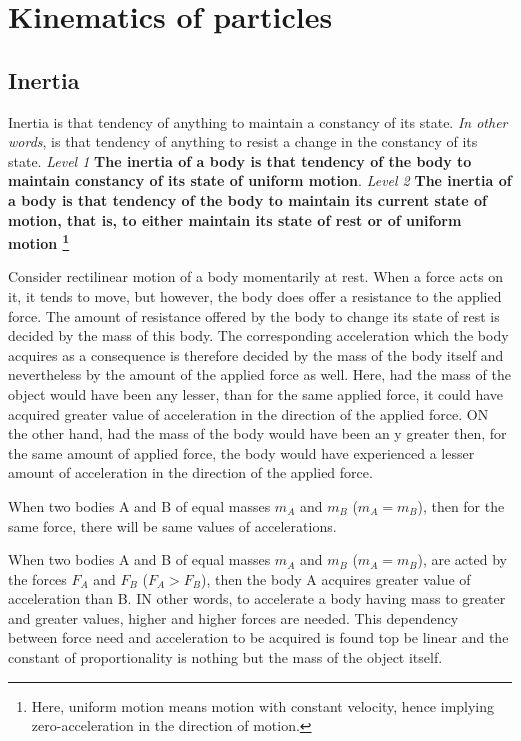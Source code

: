 \chapter{Kinematics of particles}
\section{Inertia}

\begin{flushright}
\begin{minipage}[h]{10cm}
{\small
Inertia is that tendency of anything to maintain a constancy of its state. \textit{In other words}, is that tendency of anything to resist a change in the constancy of its state. \textit{Level 1} \textbf{The inertia of a body is that tendency of the body to maintain constancy of its state of uniform motion}. \textit{Level 2}  \textbf{The inertia of a body is that tendency of the body to maintain its current state of motion, that is, to either maintain its state of rest or of uniform motion \footnote{Here, uniform motion means motion with constant velocity, hence implying zero-acceleration in the direction of motion.}}}
\end{minipage}

\end{flushright}

Consider rectilinear motion of a body momentarily at rest. When a force acts on it, it tends to move, but however, the body does offer a resistance  to the applied force. The amount of resistance offered by the body to change its state of rest is decided by the mass of this body. The corresponding acceleration which the body acquires as a consequence is therefore decided by the mass of the body itself and nevertheless by the amount of the applied force as well. Here, had the mass of the object would have been any lesser, than for the same applied force, it could have acquired greater value of acceleration in the direction of the applied force. ON the other hand, had the mass of the body would have been an y greater then, for the same amount of applied force, the body would have experienced a lesser amount of acceleration in the direction of the applied force.

When two bodies A and B of equal masses $m_A$ and $m_B$ ($m_A = m_B$), then for the same force, there will be same values of accelerations. 

When two bodies A and B of equal masses $m_A$ and $m_B$ ($m_A = m_B$), are acted by the forces $F_A$ and $F_B$ ($F_A > F_B$), then the body A acquires greater value of acceleration than B. IN other words, to accelerate a body having mass to greater and greater values, higher and higher forces are needed. This dependency between force need and acceleration to be acquired is found top be linear and the constant of proportionality is nothing but the mass of the object itself. 


